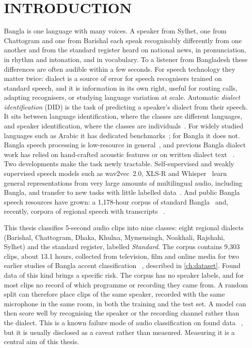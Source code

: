 \chapter{INTRODUCTION}
\label{ch:intro}

Bangla is one language with many voices. A speaker from Sylhet, one from
Chattogram and one from Barishal each speak recognisably differently from one
another and from the standard register heard on national news, in pronunciation,
in rhythm and intonation, and in vocabulary. To a listener from Bangladesh these
differences are often audible within a few seconds. For speech technology they
matter twice: dialect is a source of error for speech recognisers trained on
standard speech, and it is information in its own right, useful for routing
calls, adapting recognisers, or studying language variation at scale. Automatic
\emph{dialect identification} (DID) is the task of predicting a speaker's
dialect from their speech. It sits between language identification, where the
classes are different languages, and speaker identification, where the classes
are individuals~\cite{Snyder2018Xvectors}. For widely studied languages such as
Arabic it has dedicated benchmarks~\cite{Ali2019MGB5}; for Bangla it does not.
Bangla speech processing is low-resource in general~\cite{Mridha2021Challenges},
and previous Bangla dialect work has relied on hand-crafted acoustic features or
on written dialect text~\cite{Badhon2020Bengali} \cite{Alam2023Bangla}
\cite{Sadiq2026Bangla}. Two developments make the task newly tractable.
Self-supervised and weakly supervised speech models such as wav2vec~2.0, XLS-R
and Whisper~\cite{Baevski2020wav2vec} \cite{Babu2022XLSR} \cite{Radford2023Robust}
learn general representations from very large amounts of multilingual audio,
including Bangla, and transfer to new tasks with little labelled
data~\cite{Yang2021SUPERB}. And public Bangla speech resources have grown: a
1,178-hour corpus of standard Bangla~\cite{Rakib2023OODSpeech} and, recently,
corpora of regional speech with transcripts~\cite{Dipto2025ASR}
\cite{Hassan2025RegSpeech12}.

This thesis classifies 5-second audio clips into nine classes: eight regional
dialects (Barishal, Chattogram, Dhaka, Khulna, Mymensingh, Noakhali, Rajshahi,
Sylhet) and the standard register, labelled \emph{Standard}. The corpus contains
9,303 clips, about 13.1 hours, collected from television, film and online media
for two earlier studies of Bangla accent
classification~\cite{Badhon2020Bengali} \cite{Alam2023Bangla}, described in
\cref{ch:dataset}. Found data of this kind brings a specific risk. The corpus
has no speaker labels, and for most clips no record of which programme or
recording they came from. A random split can therefore place clips of the same
speaker, recorded with the same microphone in the same room, in both the
training and the test set. A model can then score well by recognising the
speaker or the recording channel rather than the dialect. This is a known
failure mode of audio classification on found
data~\cite{Geirhos2020Shortcut} \cite{Shulman2026EchoHawk}, but it is usually
disclosed as a caveat rather than measured. Measuring it is a central aim of
this thesis.


